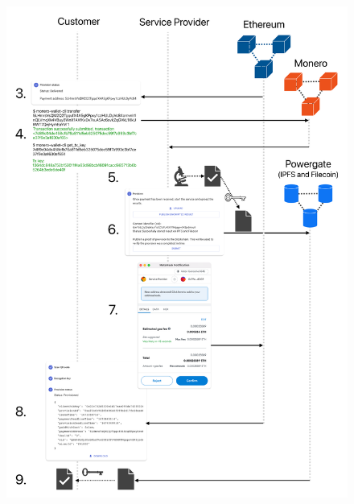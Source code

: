 \documentclass{ieeeaccess}
\begin{document}
\begin{figure}[ht]
  \begin{center}
  \includegraphics[width=\textwidth,height=\textheight,keepaspectratio]{anonser-experiment2.pdf}
  \end{center}
\end{figure}
\end{document}
